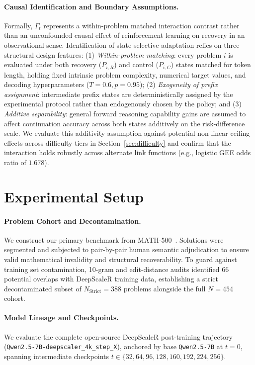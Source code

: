 \documentclass{article}
\begin{document}
\paragraph{Causal Identification and Boundary Assumptions.}
Formally, $\Gamma_t$ represents a within-problem matched interaction contrast rather than an unconfounded causal effect of reinforcement learning on recovery in an observational sense. Identification of state-selective adaptation relies on three structural design features: (1) \emph{Within-problem matching}: every problem $i$ is evaluated under both recovery ($P_{i,R}$) and control ($P_{i,C}$) states matched for token length, holding fixed intrinsic problem complexity, numerical target values, and decoding hyperparameters ($T=0.6, p=0.95$); (2) \emph{Exogeneity of prefix assignment}: intermediate prefix states are deterministically assigned by the experimental protocol rather than endogenously chosen by the policy; and (3) \emph{Additive separability}: general forward reasoning capability gains are assumed to affect continuation accuracy across both states additively on the risk-difference scale. We evaluate this additivity assumption against potential non-linear ceiling effects across difficulty tiers in Section~\ref{sec:difficulty} and confirm that the interaction holds robustly across alternate link functions (e.g., logistic GEE odds ratio of $1.678$).

\section{Experimental Setup}
\paragraph{Problem Cohort and Decontamination.}
We construct our primary benchmark from MATH-500~\cite{Hendrycks2021Measuring, Lightman2023Let}. Solutions were segmented and subjected to pair-by-pair human semantic adjudication to ensure valid mathematical invalidity and structural recoverability. To guard against training set contamination, 10-gram and edit-distance audits identified 66 potential overlaps with DeepScaleR training data, establishing a strict decontaminated subset of $N_{\text{Strict}} = 388$ problems alongside the full $N=454$ cohort.

\paragraph{Model Lineage and Checkpoints.}
We evaluate the complete open-source DeepScaleR post-training trajectory (\texttt{Qwen2.5-7B-deepscaler\_4k\_step\_X}), anchored by base \texttt{Qwen2.5-7B} at $t=0$, spanning intermediate checkpoints $t \in \{32, 64, 96, 128, 160, 192, 224, 256\}$.
\end{document}
